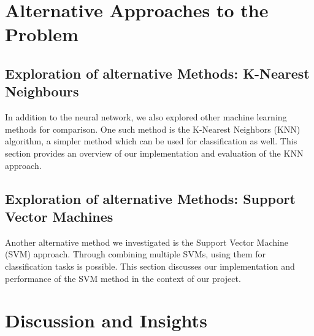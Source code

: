 \documentclass[
  12pt,
  bibliography=totoc,     %
  captions=tableheading,  %
  titlepage=firstiscover, %
]{scrartcl}
\begin{document}
\section{Alternative Approaches to the Problem}
\subsection{Exploration of alternative Methods: K-Nearest Neighbours}
In addition to the neural network, we also explored other machine learning methods for comparison. One such method is the K-Nearest Neighbors (KNN) algorithm, a simpler
method which can be used for classification as well. This section provides an overview of our implementation and evaluation of the KNN approach.
\subsection{Exploration of alternative Methods: Support Vector Machines}
Another alternative method we investigated is the Support Vector Machine (SVM) approach. Through combining multiple SVMs, using them for classification tasks is possible.
This section discusses our implementation and performance of the SVM method in the context of our project.
\section{Discussion and Insights}
\printbibliography
\end{document}
